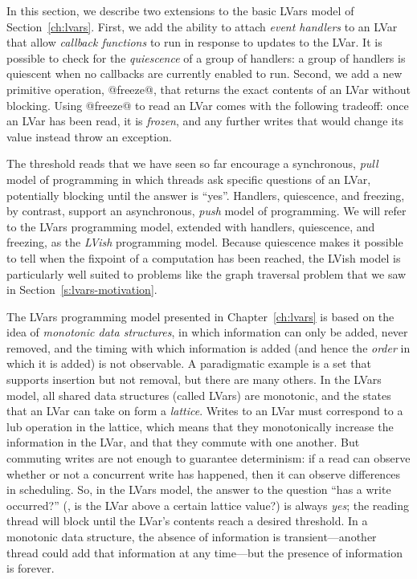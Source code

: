 \ifdefined\JOURNAL
In this section, we describe two extensions to the basic LVars model
of Section~\ref{ch:lvars}.  First, we add the ability to
attach \emph{event handlers} to an LVar that allow \emph{callback
functions} to run in response to updates to the LVar.  It is possible
to check for the \emph{quiescence} of a group of handlers: a group of
handlers is quiescent when no callbacks are currently enabled to run.
Second, we add a new primitive operation, @freeze@, that returns the
exact contents of an LVar without blocking.  Using @freeze@ to read an
LVar comes with the following tradeoff: once an LVar has been read, it
is \emph{frozen}, and any further writes that would change its value
instead throw an exception.

The threshold reads that we have seen so far encourage a
synchronous, \emph{pull} model of programming in which threads ask
specific questions of an LVar, potentially blocking until the answer
is ``yes''.  Handlers, quiescence, and freezing, by contrast, support
an asynchronous, \emph{push} model of programming.  We will refer to
the LVars programming model, extended with handlers, quiescence, and
freezing, as the \emph{LVish} programming model.  Because quiescence
makes it possible to tell when the fixpoint of a computation has been
reached, the LVish model is particularly well suited to problems like
the graph traversal problem that we saw in
Section~\ref{s:lvars-motivation}.
\fi

\ifdefined\DISSERTATION
The LVars programming model presented in Chapter~\ref{ch:lvars} is
based on the idea of \emph{monotonic data structures}, in which
information can only be added, never removed, and the timing with
which information is added (and hence the \emph{order} in which it is
added) is not observable.  A paradigmatic example is a set that
supports insertion but not removal, but there are many others.  In the
LVars model, all shared data structures (called LVars) are monotonic,
and the states that an LVar can take on form a \emph{lattice}.  Writes
to an LVar must correspond to a lub operation in the lattice, which
means that they monotonically increase the information in the LVar,
and that they commute with one another.  But commuting writes are not
enough to guarantee determinism: if a read can observe whether or not
a concurrent write has happened, then it can observe differences in
scheduling.  So, in the LVars model, the answer to the question ``has
a write occurred?''  (\ie, is the LVar above a certain lattice value?)
is always
\emph{yes}; the reading thread will block until the LVar's contents
reach a desired threshold.  In a monotonic data structure, the absence
of information is transient---another thread could add that
information at any time---but the presence of information is forever.

